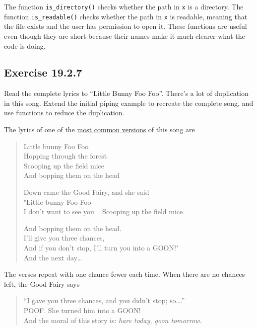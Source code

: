 \documentclass[]{book}
\theoremstyle{plain}
\theoremstyle{remark}
\theoremstyle{definition}
\theoremstyle{definition}
\theoremstyle{definition}
\theoremstyle{remark}
\begin{document}
The function \texttt{is\_directory()} checks whether the path in
\texttt{x} is a directory. The function \texttt{is\_readable()} checks
whether the path in \texttt{x} is readable, meaning that the file exists
and the user has permission to open it. These functions are useful even
though they are short because their names make it much clearer what the
code is doing.

\hypertarget{exercise-19.2.7}{%
\subsection*{\texorpdfstring{Exercise
{19.2.7}}{Exercise 19.2.7}}\label{exercise-19.2.7}}

Read the complete lyrics to ``Little Bunny Foo Foo''. There's a lot of
duplication in this song. Extend the initial piping example to recreate
the complete song, and use functions to reduce the duplication.

The lyrics of one of the
\href{https://en.wikipedia.org/wiki/Little_Bunny_Foo_Foo}{most common
versions} of this song are

\begin{quote}
Little bunny Foo Foo\\
Hopping through the forest\\
Scooping up the field mice\\
And bopping them on the head

Down came the Good Fairy, and she said\\
"Little bunny Foo Foo\\
I don't want to see you ~ Scooping up the field mice

And bopping them on the head.\\
I'll give you three chances,\\
And if you don't stop, I'll turn you into a GOON!"\\
And the next day\ldots{}
\end{quote}

The verses repeat with one chance fewer each time. When there are no
chances left, the Good Fairy says

\begin{quote}
``I gave you three chances, and you didn't stop; so\ldots{}.''\\
POOF. She turned him into a GOON!\\
And the moral of this story is: \emph{hare today, goon tomorrow.}
\end{quote}
\end{document}
